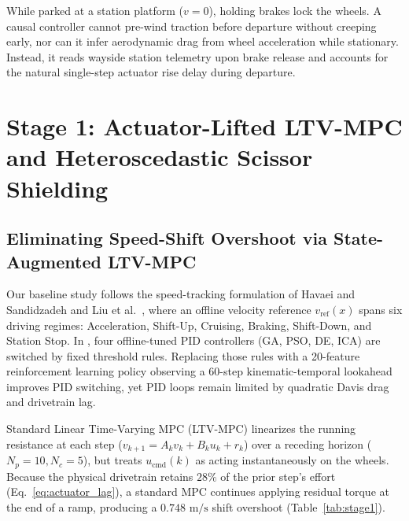 \documentclass[10pt,a4paper]{article}
\begin{document}
While parked at a station platform ($v = 0$), holding brakes lock the wheels. A causal controller cannot pre-wind traction before departure without creeping early, nor can it infer aerodynamic drag from wheel acceleration while stationary. Instead, it reads wayside station telemetry upon brake release and accounts for the natural single-step actuator rise delay during departure.

\section{Stage 1: Actuator-Lifted LTV-MPC and Heteroscedastic Scissor Shielding}

\subsection{Eliminating Speed-Shift Overshoot via State-Augmented LTV-MPC}

Our baseline study follows the speed-tracking formulation of Havaei and Sandidzadeh \cite{havaei2022} and Liu et al.\ \cite{liu2025}, where an offline velocity reference $v_{\text{ref}}(x)$ spans six driving regimes: Acceleration, Shift-Up, Cruising, Braking, Shift-Down, and Station Stop. In \cite{havaei2022}, four offline-tuned PID controllers (GA, PSO, DE, ICA) are switched by fixed threshold rules. Replacing those rules with a 20-feature reinforcement learning policy observing a 60-step kinematic-temporal lookahead improves PID switching, yet PID loops remain limited by quadratic Davis drag and drivetrain lag.

Standard Linear Time-Varying MPC (LTV-MPC) \cite{liu2025} linearizes the running resistance at each step ($v_{k+1} = A_k v_k + B_k u_k + r_k$) over a receding horizon ($N_p = 10, N_c = 5$), but treats $u_{\text{cmd}}(k)$ as acting instantaneously on the wheels. Because the physical drivetrain retains $28\%$ of the prior step's effort (Eq.~\ref{eq:actuator_lag}), a standard MPC continues applying residual torque at the end of a ramp, producing a $0.748\text{ m/s}$ shift overshoot (Table~\ref{tab:stage1}).
\end{document}
